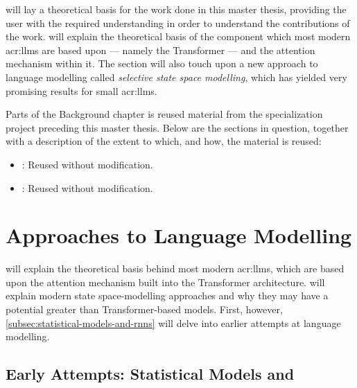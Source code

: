  will lay a theoretical basis for the work done in this master thesis, providing the user with the required understanding in order to understand the contributions of the work.  will explain the theoretical basis of the component which most modern \glspl{acr:llm} are based upon --- namely the Transformer --- and the attention mechanism within it. The section will also touch upon a new approach to language modelling called \textit{selective state space modelling}, which has yielded very promising results for small \glspl{acr:llm}.

\vspace{12pt}

\begin{itshape}
    \noindent Parts of the Background chapter is reused material from the specialization project \citep{holmLLMsDeathGIS2023} preceding this master thesis. Below are the sections in question, together with a description of the extent to which, and how, the material is reused:

    \begin{itemize}
        \item {}: Reused without modification.
        \item {}: Reused without modification.
    \end{itemize}
\end{itshape}


\section{Approaches to Language Modelling}
\label{sec:language-modelling}

 will explain the theoretical basis behind most modern \glspl{acr:llm}, which are based upon the attention mechanism built into the Transformer architecture.  will explain modern state space-modelling approaches and why they may have a potential greater than Transformer-based models. First, however, \autoref{subsec:statistical-models-and-rnns} will delve into earlier attempts at language modelling.

\subsection[Early Attempts: Statistical Models and Recurrent Neural Networks]{Early Attempts: Statistical Models and }
\label{subsec:statistical-models-and-rnns}

